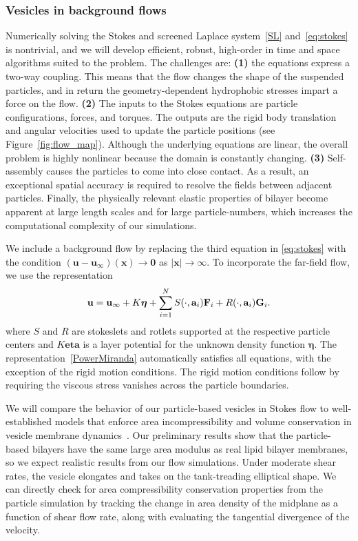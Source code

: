 \subsubsection{Vesicles in background flows}
Numerically solving the Stokes and screened Laplace system~\eqref{SL}
and~\eqref{eq:stokes} is nontrivial, and we will develop efficient,
robust, high-order in time and space algorithms suited to the problem.
The challenges are: {\bf (1)} the equations express a two-way coupling.
This means that the flow changes the shape of the suspended particles,
and in return the geometry-dependent hydrophobic stresses impart a force
on the flow. {\bf (2)} The inputs to the Stokes equations are particle
configurations, forces, and torques. The outputs are the rigid body
translation and angular velocities used to update the particle positions
(see Figure~\ref{fig:flow_map}). Although the underlying equations are
linear, the overall problem is highly nonlinear because the domain is
constantly changing. {\bf (3)} Self-assembly causes the particles to
come into close contact. As a result, an exceptional spatial accuracy is
required to resolve the fields between adjacent particles. Finally, the
physically relevant elastic properties of bilayer become apparent at
large length scales and for large particle-numbers, which increases the
computational complexity of our simulations. 

We include a background flow by replacing the third equation in
\eqref{eq:stokes} with the condition $(\mathbf{u} -
\mathbf{u}_{\infty})(\mathbf{x}) \to \mathbf{0}$ as $|\mathbf{x}| \to
\infty$. To incorporate the far-field flow, we use the representation 
\begin{align}
\label{PowerMiranda}
  {\bf u} = {\bf u}_{\infty} + K\boldsymbol{\eta} + 
    \sum_{i=1}^N S(\cdot, {\bf a}_i) {\bf F}_i + 
                 R(\cdot, {\bf a}_i) {\bf G}_i.
\end{align}
where $S$ and $R$ are stokeslets and rotlets supported at the respective
particle centers and $K\boldsymbol{eta}$ is a layer potential for the
unknown density function $\boldsymbol{\eta}.$ The
representation~\eqref{PowerMiranda} automatically satisfies all
equations, with the exception of the rigid motion conditions. The rigid
motion conditions follow by requiring the viscous stress vanishes across
the particle boundaries.

We will compare the behavior of our particle-based vesicles in Stokes
flow to well-established models that enforce area incompressibility and
volume conservation in vesicle membrane
dynamics~\cite{torres-sanchez_millan_arroyo_2019,
mahapatra_saintillan_rangamani_2020, Steigmann99, C6SM02452A}. Our
preliminary results show that the particle-based bilayers have the same
large area modulus as real lipid bilayer membranes, so we expect
realistic results from our flow simulations. Under moderate shear rates,
the vesicle elongates and takes on the tank-treading elliptical shape.
We can directly check for area compressibility conservation properties
from the particle simulation by tracking the change in area density of
the midplane as a function of shear flow rate, along with evaluating the
tangential divergence of the velocity.

